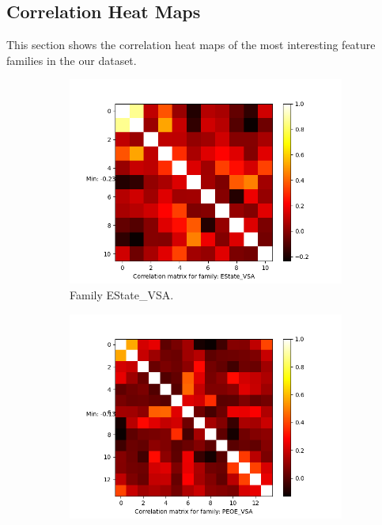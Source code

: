 \documentclass[11pt]{article}
\begin{document}
\subsection{Correlation Heat Maps}
\label{CorrHeatMapsAppendix}
This section shows the correlation heat maps of the most interesting feature families in the our dataset.
\begin{figure}
     \centering
     \begin{subfigure}[b]{0.45\textwidth}
         \centering
    \includegraphics[scale=0.5]{images/correlationEStateVSA}
    \caption{Family EState\_VSA.}
    \label{fig:correlationEStateVSA}
     \end{subfigure}
     \hfill
     \begin{subfigure}[b]{0.45\textwidth}
         \centering
        \includegraphics[scale=0.5]{images/correlationPEOEVSA}

\end{subfigure}
\end{figure}
\end{document}
